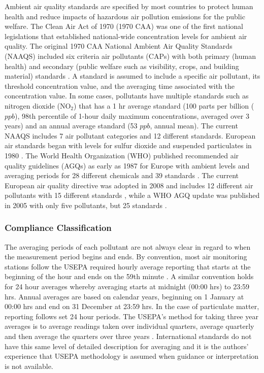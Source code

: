 Ambient air quality standards are specified by most countries to protect human health and reduce impacts of hazardous air pollution emissions for the public welfare. The Clean Air Act of 1970 (1970 CAA) was one of the first national legislations that established national-wide concentration levels for ambient air quality.  The original 1970 CAA National Ambient Air Quality Standards (NAAQS) included six criteria air pollutants (CAPs) with both primary (human health) and secondary (public welfare such as visibility, crops, and building material) standards \citep{USEPA1970}. A standard is assumed to include a specific air pollutant, its threshold concentration value, and the averaging time associated with the concentration value. In some cases, pollutants have multiple standards such as nitrogen dioxide (NO$_{2}$) that has a 1 hr average standard (100 parts per billion ($ppb$), 98th percentile of 1-hour daily maximum concentrations, averaged over 3 years) and an annual average standard (53 $ppb $, annual mean). The current NAAQS includes 7 air pollutant categories and 12 different standards. European air standards began with levels for sulfur dioxide and suspended particulates in 1980 \citep{EEC1980}. The World Health Organization (WHO) published recommended air quality guidelines (AGQs) as early as 1987 for Europe with ambient levels and averaging periods for 28 different chemicals and 39 standards \citep{Lubkert1994}. The current European air quality directive was adopted in 2008 and includes 12 different air pollutants with 15 different standards \citep{EU2008}, while a WHO AGQ update was published in 2005 with only five pollutants, but 25 standards \citep{WHO2006}. 

\subsubsection{Compliance Classification}

The averaging periods of each pollutant are not always clear in regard to when the measurement period begins and ends.  By convention, most air monitoring stations follow the USEPA required hourly average reporting that starts at the beginning of the hour and ends on the 59th minute \citep{CAA2007}.  A similar convention holds for 24 hour averages whereby averaging starts at midnight (00:00 hrs) to 23:59 hrs. Annual averages are based on calendar years, beginning on 1 January at 00:00 hrs and end on 31 December at 23:59 hrs.  In the case of particulate matter, reporting follows set 24 hour periods.  The USEPA’s method for taking three year averages is to average readings taken over individual quarters, average quarterly and then average the quarters over three years \citep{Cohen1999}. International standards do not have this same level of detailed description for averaging and it is the authors’ experience that USEPA methodology is assumed when guidance or interpretation is not available.

